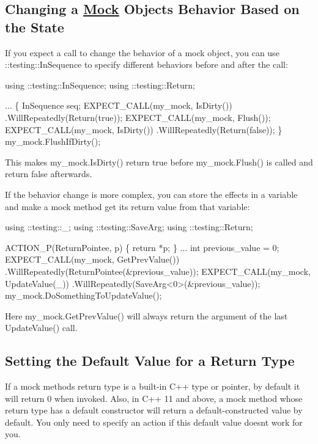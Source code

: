 \subsection*{Changing a \hyperlink{classMock}{Mock} Object\textquotesingle{}s Behavior Based on the State}

If you expect a call to change the behavior of a mock object, you can use {\ttfamily \+::testing\+::\+In\+Sequence} to specify different behaviors before and after the call\+:


\begin{DoxyCode}
using ::testing::InSequence;
using ::testing::Return;

...
  \{
    InSequence seq;
    EXPECT\_CALL(my\_mock, IsDirty())
        .WillRepeatedly(Return(\textcolor{keyword}{true}));
    EXPECT\_CALL(my\_mock, Flush());
    EXPECT\_CALL(my\_mock, IsDirty())
        .WillRepeatedly(Return(\textcolor{keyword}{false}));
  \}
  my\_mock.FlushIfDirty();
\end{DoxyCode}


This makes {\ttfamily my\+\_\+mock.\+Is\+Dirty()} return {\ttfamily true} before {\ttfamily my\+\_\+mock.\+Flush()} is called and return {\ttfamily false} afterwards.

If the behavior change is more complex, you can store the effects in a variable and make a mock method get its return value from that variable\+:


\begin{DoxyCode}
using ::testing::\_;
using ::testing::SaveArg;
using ::testing::Return;

ACTION\_P(ReturnPointee, p) \{ \textcolor{keywordflow}{return} *p; \}
...
  \textcolor{keywordtype}{int} previous\_value = 0;
  EXPECT\_CALL(my\_mock, GetPrevValue())
      .WillRepeatedly(ReturnPointee(&previous\_value));
  EXPECT\_CALL(my\_mock, UpdateValue(\_))
      .WillRepeatedly(SaveArg<0>(&previous\_value));
  my\_mock.DoSomethingToUpdateValue();
\end{DoxyCode}


Here {\ttfamily my\+\_\+mock.\+Get\+Prev\+Value()} will always return the argument of the last {\ttfamily Update\+Value()} call.

\subsection*{Setting the Default Value for a Return Type}

If a mock method\textquotesingle{}s return type is a built-\/in C++ type or pointer, by default it will return 0 when invoked. Also, in C++ 11 and above, a mock method whose return type has a default constructor will return a default-\/constructed value by default. You only need to specify an action if this default value doesn\textquotesingle{}t work for you.

